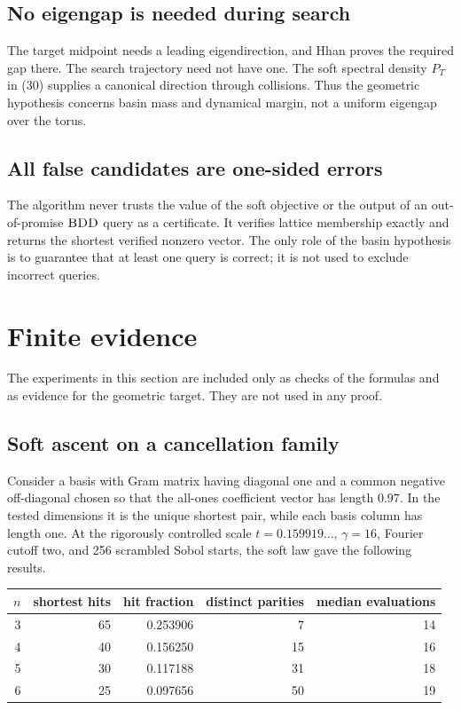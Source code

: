 \documentclass[10pt]{article}
\theoremstyle{definition}
\newcommand{\BDD}{\textnormal{\textsc{BDD}}}
\begin{document}
\subsection{No eigengap is needed during search}

The target midpoint needs a leading eigendirection, and Hhan proves the
required gap there.  The search trajectory need not have one.  The soft
spectral density $P_T$ in (30) supplies a canonical direction through
collisions.  Thus the geometric hypothesis concerns basin mass and dynamical
margin, not a uniform eigengap over the torus.

\subsection{All false candidates are one-sided errors}

The algorithm never trusts the value of the soft objective or the output of
an out-of-promise $\BDD$ query as a certificate.  It verifies lattice
membership exactly and returns the shortest verified nonzero vector.  The
only role of the basin hypothesis is to guarantee that at least one query is
correct; it is not used to exclude incorrect queries.

\section{Finite evidence}

The experiments in this section are included only as checks of the formulas
and as evidence for the geometric target.  They are not used in any proof.

\subsection{Soft ascent on a cancellation family}

Consider a basis with Gram matrix having diagonal one and a common negative
off-diagonal chosen so that the all-ones coefficient vector has length
$0.97$.  In the tested dimensions it is the unique shortest pair, while each
basis column has length one.  At the rigorously controlled scale
$t=0.159919\ldots$, $\gamma=16$, Fourier cutoff two, and 256 scrambled Sobol
starts, the soft law gave the following results.

\begin{center}
\begin{tabular}{rrrrr}
\toprule
$n$ & shortest hits & hit fraction & distinct parities & median evaluations\\
\midrule
3 & 65 & 0.253906 & 7  & 14\\
4 & 40 & 0.156250 & 15 & 16\\
5 & 30 & 0.117188 & 31 & 18\\
6 & 25 & 0.097656 & 50 & 19\\
\bottomrule
\end{tabular}
\end{center}
\end{document}

